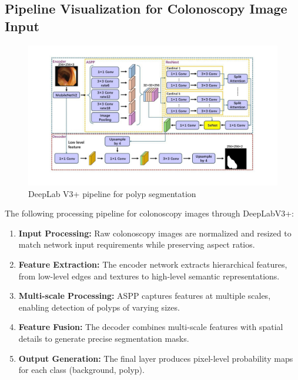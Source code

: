 \documentclass[a4paper,12pt]{report}
\begin{document}
\subsection{Pipeline Visualization for Colonoscopy Image Input}


\begin{figure}[h]
    \centering
    \includegraphics[width=\textwidth]{pipeline.jpg}
    \caption{DeepLab V3+ pipeline for polyp segmentation}
    \label{fig:Deeplabv3+_pipeline}
\end{figure}

The following processing pipeline for colonoscopy images through DeepLabV3+:

\begin{enumerate}
    \item \textbf{Input Processing:} Raw colonoscopy images are normalized and resized to match network input requirements while preserving aspect ratios.

   \item \textbf{Feature Extraction:} The encoder network extracts hierarchical features, from low-level edges and textures to high-level semantic representations.

    \item \textbf{Multi-scale Processing:} ASPP captures features at multiple scales, enabling detection of polyps of varying sizes.

    \item \textbf{Feature Fusion:} The decoder combines multi-scale features with spatial details to generate precise segmentation masks.

    \item \textbf{Output Generation:} The final layer produces pixel-level probability maps for each class (background, polyp).
\end{enumerate}
\end{document}
